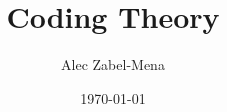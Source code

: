 \documentclass[12pt, twoside]{book}
\title{Coding Theory}
\author{Alec Zabel-Mena}
\date{\today}
\begin{document}
\maketitle
\tableofcontents
\newpage



\nocite{*}



\end{document}
